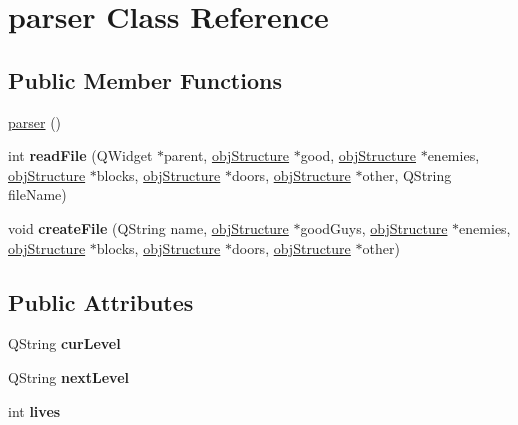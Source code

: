 \hypertarget{classparser}{\section{parser Class Reference}
\label{classparser}
}
\subsection*{Public Member Functions}
\begin{DoxyCompactItemize}
\item 
\hyperlink{classparser_ac4cb16e924a735dfb5837772afa1a1a9}{parser} ()
\item 
\hypertarget{classparser_aa16938ad5757d700376a6fadb4e11e2a}{int {\bfseries read\-File} (Q\-Widget $\ast$parent, \hyperlink{classobj_structure}{obj\-Structure} $\ast$good, \hyperlink{classobj_structure}{obj\-Structure} $\ast$enemies, \hyperlink{classobj_structure}{obj\-Structure} $\ast$blocks, \hyperlink{classobj_structure}{obj\-Structure} $\ast$doors, \hyperlink{classobj_structure}{obj\-Structure} $\ast$other, Q\-String file\-Name)}\label{classparser_aa16938ad5757d700376a6fadb4e11e2a}

\item 
\hypertarget{classparser_ace9c694c314e8314bcee42ca751f64a0}{void {\bfseries create\-File} (Q\-String name, \hyperlink{classobj_structure}{obj\-Structure} $\ast$good\-Guys, \hyperlink{classobj_structure}{obj\-Structure} $\ast$enemies, \hyperlink{classobj_structure}{obj\-Structure} $\ast$blocks, \hyperlink{classobj_structure}{obj\-Structure} $\ast$doors, \hyperlink{classobj_structure}{obj\-Structure} $\ast$other)}\label{classparser_ace9c694c314e8314bcee42ca751f64a0}

\end{DoxyCompactItemize}
\subsection*{Public Attributes}
\begin{DoxyCompactItemize}
\item 
\hypertarget{classparser_a60fba17300bd869e168287358a620fc2}{Q\-String {\bfseries cur\-Level}}\label{classparser_a60fba17300bd869e168287358a620fc2}

\item 
\hypertarget{classparser_aded4d171590ab8bc5ff16d28349e72c5}{Q\-String {\bfseries next\-Level}}\label{classparser_aded4d171590ab8bc5ff16d28349e72c5}

\item 
\hypertarget{classparser_a700ed3fe73034eb63ed69dd40f3de7b1}{int {\bfseries lives}}\label{classparser_a700ed3fe73034eb63ed69dd40f3de7b1}

\end{DoxyCompactItemize}


